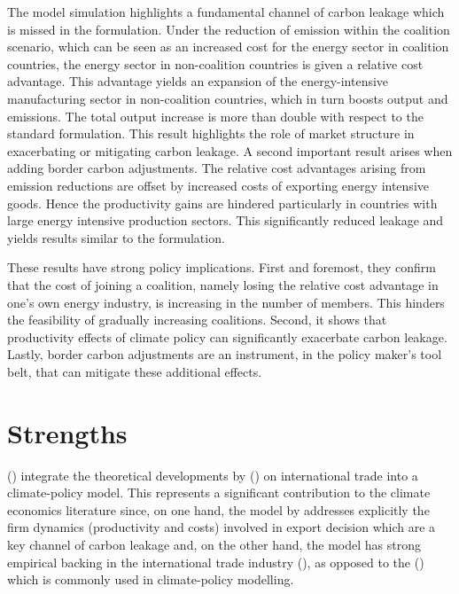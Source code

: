 \documentclass[american]{scrartcl}
\newcommand{\citein}[1]{\citeauthor{#1} (\citeyear{#1})}
\begin{document}
The model simulation highlights a fundamental channel of carbon leakage which is missed in the \citeauthor{Armington1969} formulation. Under the reduction of emission within the coalition scenario, which can be seen as an increased cost for the energy sector in coalition countries, the energy sector in non-coalition countries is given a relative cost advantage. This advantage yields an expansion of the energy-intensive manufacturing sector in non-coalition countries, which in turn boosts output and emissions. The total output increase is more than double with respect to the standard \citeauthor{Armington1969} formulation. This result highlights the role of market structure in exacerbating or mitigating carbon leakage. A second important result arises when adding border carbon adjustments. The relative cost advantages arising from emission reductions are offset by increased costs of exporting energy intensive goods. Hence the productivity gains are hindered particularly in countries with large energy intensive production sectors. This significantly reduced leakage and yields results similar to the \citeauthor{Armington1969} formulation.

These results have strong policy implications. First and foremost, they confirm that the cost of joining a coalition, namely losing the relative cost advantage in one's own energy industry, is increasing in the number of members. This hinders the feasibility of gradually increasing coalitions. Second, it shows that productivity effects of climate policy can significantly exacerbate carbon leakage. Lastly, border carbon adjustments are an instrument, in the policy maker's tool belt, that can mitigate these additional effects.

\section{Strengths}

\citein{Balistreri2012} integrate the theoretical developments by \citein{Melitz2003} on international trade into a climate-policy model. This represents a significant contribution to the climate economics literature since, on one hand, the model by \citeauthor{Melitz2003} addresses explicitly the firm dynamics (productivity and costs) involved in export decision which are a key channel of carbon leakage and, on the other hand, the model has strong empirical backing in the international trade industry (\cite{Helpman2008}), as opposed to the \citein{Armington1969} which is commonly used in climate-policy modelling.
\end{document}
